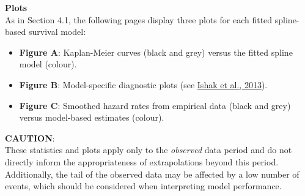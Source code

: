 \documentclass[
]{article}
\providecommand{\tightlist}{%
  \setlength{\itemsep}{0pt}\setlength{\parskip}{0pt}}
\begin{document}
\textbf{Plots}\\
As in Section 4.1, the following pages display three plots for each
fitted spline-based survival model:

\begin{itemize}
\tightlist
\item
  \textbf{Figure A}: Kaplan-Meier curves (black and grey) versus the
  fitted spline model (colour).\\
\item
  \textbf{Figure B}: Model-specific diagnostic plots (see
  \href{https://doi.org/10.1007/s40273-013-0064-3}{Ishak et al.,
  2013}).\\
\item
  \textbf{Figure C}: Smoothed hazard rates from empirical data (black
  and grey) versus model-based estimates (colour).
\end{itemize}

\textbf{CAUTION}:\\
These statistics and plots apply only to the \emph{observed} data period
and do not directly inform the appropriateness of extrapolations beyond
this period.\\
Additionally, the tail of the observed data may be affected by a low
number of events, which should be considered when interpreting model
performance.

\clearpage

\begin{table}[H]
\centering
\caption{\label{tab:Table_4}Goodness of fit statistics (including standard parametric and cure models)}
\centering
{}
\end{table}
\end{document}
